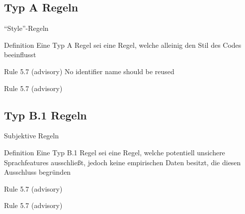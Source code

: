\documentclass{beamer}
\begin{document}
    \subsection{Typ A Regeln}
    \label{subsec:typ-a-regeln}
    \begin{frame}{\enquote{Style}-Regeln}
         {
            \begin{block}{Definition}
                Eine Typ A Regel sei eine Regel, welche alleinig den Stil des Codes beeinflusst
            \end{block}
            \pause
            \begin{exampleblock}{Rule 5.7 (advisory)}
                No identifier name should be reused
            \end{exampleblock}
        }
         {
            \begin{exampleblock}{Rule 5.7 (advisory)}
                
            \end{exampleblock}
        }
    \end{frame}

    \subsection{Typ B.1 Regeln}
    \label{subsec:typ-b-1-regeln}
    \begin{frame}{Subjektive Regeln}
         {
            \begin{block}{Definition}
                Eine Typ B.1 Regel sei eine Regel, welche potentiell unsichere Sprachfeatures ausschließt,
                jedoch keine empirischen Daten besitzt, die diesen Ausschluss begründen
            \end{block}
            \pause
            \begin{exampleblock}{Rule 5.7 (advisory)} %
            \end{exampleblock}
        }
         {
            \begin{exampleblock}{Rule 5.7 (advisory)}
                
            \end{exampleblock}
        }
    \end{frame}
\end{document}
